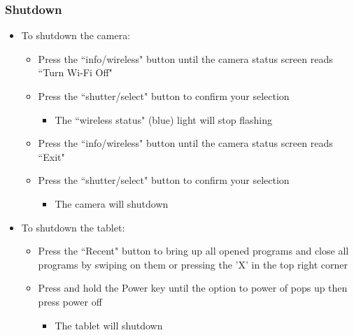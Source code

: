 \documentclass[letterpaper,11pt]{article}
\begin{document}
    \subsubsection{Shutdown}
        \begin{itemize}
        \item To shutdown the camera:
            \begin{itemize}
            \item Press the ``info/wireless" button 
                until the camera status screen reads ``Turn Wi-Fi Off"
            \item Press the ``shutter/select" button to confirm your selection
                \begin{itemize}
                \item The ``wireless status" (blue) light will stop flashing
                \end{itemize}
            
            \item Press the ``info/wireless" button until the camera status 
                screen reads ``Exit"
            \item Press the ``shutter/select" button to confirm your selection
                \begin{itemize}
                \item The camera will shutdown 
                \end{itemize}
            
            \end{itemize}
        
        \item To shutdown the tablet:
            \begin{itemize}
            \item Press the ``Recent" button to bring up all opened programs and 
                close all programs by swiping on them or pressing the 'X' in the
                top right corner
            \item Press and hold the Power key until the option to power of 
                pops up then press power off
                \begin{itemize}
                \item The tablet will shutdown
                \end{itemize}
           
            \end{itemize}
        
        \end{itemize}
    
\end{document}
